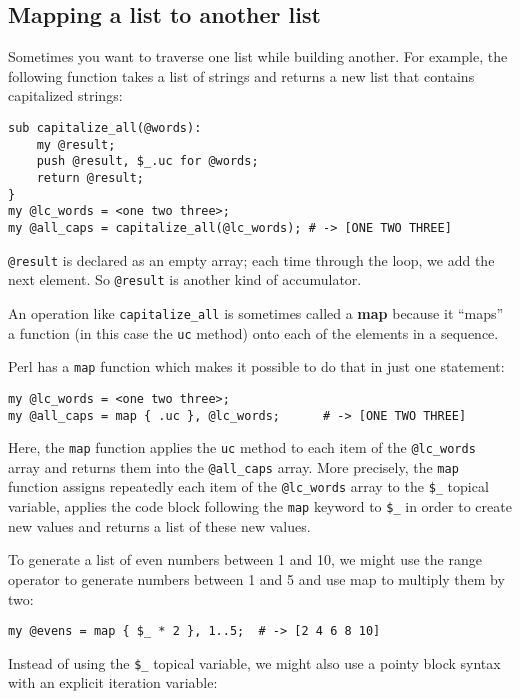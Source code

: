 \subsection{Mapping a list to another list}

Sometimes you want to traverse one list while building
another.  For example, the following function takes a list 
of strings and returns a new list that contains capitalized 
strings:

\begin{verbatim}
sub capitalize_all(@words):
    my @result;
    push @result, $_.uc for @words;
    return @result;
}
my @lc_words = <one two three>;
my @all_caps = capitalize_all(@lc_words); # -> [ONE TWO THREE]
\end{verbatim}
%
\verb'@result' is declared as an empty array; each time through
the loop, we add the next element.  So \verb'@result' is 
another kind of accumulator.

An operation like \verb"capitalize_all" is sometimes called a {\bf map} because it ``maps'' a function (in this case the {\tt uc} method) onto each of the elements in a sequence.

Perl has a {\tt map} function which makes it possible to 
do that in just one statement:

\begin{verbatim}
my @lc_words = <one two three>;
my @all_caps = map { .uc }, @lc_words;      # -> [ONE TWO THREE]
\end{verbatim}
%

Here, the {\tt map} function applies the {\tt uc} method to 
each item of the \verb'@lc_words' array and returns them 
into the \verb'@all_caps' array. More precisely, the {\tt map} 
function assigns repeatedly each item of the \verb'@lc_words' 
array to the \verb'$_' topical variable, applies the 
code block following the {\tt map} keyword to \verb'$_' in 
order to create new values and returns a list of these new 
values.

To generate a list of even numbers between 1 and 10, we might use the range operator to generate numbers between 1 and 5 
and use map to multiply them by two:

\begin{verbatim}
my @evens = map { $_ * 2 }, 1..5;  # -> [2 4 6 8 10]
\end{verbatim}
%

Instead of using the \verb'$_' topical variable, we might 
also use a pointy block syntax with an explicit iteration 
variable:

